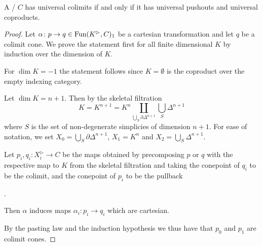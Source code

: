 \begin{lemma}\label{lem:univColimIffUnivPoAndCoprod}
    A \inftycat/ $C$ has universal colimits if and only if it has universal pushouts and universal coproducts.
    \begin{proof}
        Let $\alpha\colon p\to q\in\operatorname{Fun}(K^{\rhd},C)_1$ be a cartesian transformation and let $q$ be a colimit cone. 
        We prove the statement first for all finite dimensional $K$ by induction over the dimension of $K$.

        For $\dim K=-1$ the statement follows since $K=\emptyset$ is the coproduct over the empty indexing category.
        
        Let $\dim K=n+1$. 
        Then by the skeletal filtration
        \begin{equation*}
            K=K^{n+1}=K^n\coprod\limits_{\bigcup\limits_S \partial\Delta^{n+1}}\bigcup_S \Delta^{n+1}
        \end{equation*}
        where $S$ is the set of non-degenerate simplicies of dimension $n+1$.
        For ease of notation, we set $X_{0}=\bigcup\limits_S \partial\Delta^{n+1}$, $X_1=K^n$ and $X_2=\bigcup\limits_S \Delta^{n+1}$.

        Let $p_i,q_i\colon X_i^{\rhd}\to C$ be the maps obtained by precomposing $p$ or $q$ with the respective map to $K$ from the skeletal filtration and taking the conepoint of $q_i$ to be the colimit, and the conepoint of $p_i$ to be the pullback %
        \begin{center}
            \;.
        \end{center}
        Then $\alpha$ induces maps $\alpha_i\colon p_i\to q_i$ which are cartesian. %

        By the pasting law and the induction hypothesis we thus have that $p_0$ and $p_1$ are colimit cones.


\end{proof}
\end{lemma}
